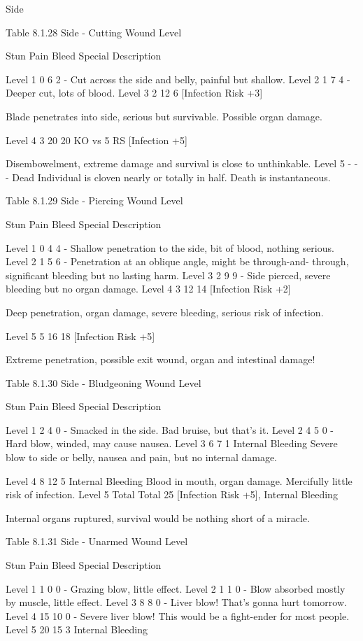 \documentclass[oneside,11pt,english]{book}
\begin{document}
Side 

 
Table 8.1.28 Side - Cutting 
Wound 
Level 

Stun Pain Bleed Special Description 

Level 1 0 6 2 - Cut across the side and belly, painful but shallow. 
Level 2 1 7 4 - Deeper cut, lots of blood. 
Level 3 2 12 6 [Infection Risk 
+3] 

Blade penetrates into side, serious but survivable. Possible 
organ damage. 

Level 4 3 20 20 KO vs 5 RS 
[Infection +5] 

Disembowelment, extreme damage and survival is close to 
unthinkable. 
Level 5 - - - Dead Individual is cloven nearly or totally in half. Death is 
instantaneous. 

 
Table 8.1.29 Side - Piercing 
Wound 
Level 

Stun Pain Bleed Special Description 

Level 1 0 4 4 - Shallow penetration to the side, bit of blood, nothing serious. 
Level 2 1 5 6 - Penetration at an oblique angle, might be through-and-
through, significant bleeding but no lasting harm. 
Level 3 2 9 9 - Side pierced, severe bleeding but no organ damage. 
Level 4 3 12 14 [Infection 
Risk +2] 

Deep penetration, organ damage, severe bleeding, serious risk 
of infection. 

Level 5 5 16 18 [Infection 
Risk +5] 

Extreme penetration, possible exit wound, organ and 
intestinal damage! 

 
Table 8.1.30 Side - Bludgeoning 
Wound 
Level 

Stun Pain Bleed Special Description 

Level 1 2 4 0 - Smacked in the side. Bad bruise, but that’s it. 
Level 2 4 5 0 - Hard blow, winded, may cause nausea. 
Level 3 6 7 1 Internal Bleeding Severe blow to side or belly, nausea and pain, 
but no internal damage. 


Level 4 8 12 5 Internal Bleeding Blood in mouth, organ damage. Mercifully little 
risk of infection. 
Level 5 Total Total 25 [Infection Risk +5], 
Internal Bleeding 

Internal organs ruptured, survival would be 
nothing short of a miracle. 

 
Table 8.1.31 Side - Unarmed 
Wound 
Level 

Stun Pain Bleed Special Description 

Level 1 1 0 0 - Grazing blow, little effect. 
Level 2 1 1 0 - Blow absorbed mostly by muscle, little effect. 
Level 3 8 8 0 - Liver blow! That’s gonna hurt tomorrow. 
Level 4 15 10 0 - Severe liver blow! This would be a fight-ender for most 
people. 
Level 5 20 15 3 Internal 
Bleeding 
\end{document}
